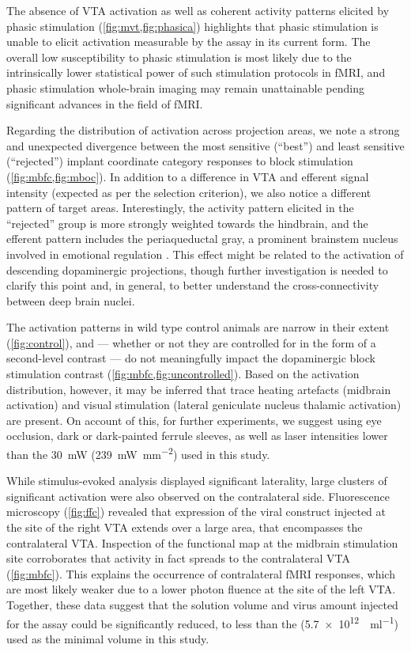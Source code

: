 The absence of VTA activation as well as coherent activity patterns elicited by phasic stimulation (\cref{fig:mvt,fig:phasica}) highlights that phasic stimulation is unable to elicit activation measurable by the assay in its current form.
The overall low susceptibility to phasic stimulation is most likely due to the intrinsically lower statistical power of such stimulation protocols in fMRI, and phasic stimulation whole-brain imaging may remain unattainable pending significant advances in the field of fMRI.

Regarding the distribution of activation across projection areas, we note a strong and unexpected divergence between the most sensitive (“best”) and least sensitive (“rejected”) implant coordinate category responses to block stimulation (\cref{fig:mbfc,fig:mboc}).
In addition to a difference in VTA and efferent signal intensity (expected as per the selection criterion), we also notice a different pattern of target areas.
Interestingly, the activity pattern elicited in the “rejected” group is more strongly weighted towards the hindbrain, and the efferent pattern includes the periaqueductal gray, a prominent brainstem nucleus involved in emotional regulation \cite{Benarroch2012}.
This effect might be related to the activation of descending dopaminergic projections, though further investigation is needed to clarify this point and, in general, to better understand the cross-connectivity between deep brain nuclei.

The activation patterns in wild type control animals are narrow in their extent (\cref{fig:control}), and --- whether or not they are controlled for in the form of a second-level contrast --- do not meaningfully impact the dopaminergic block stimulation contrast (\cref{fig:mbfc,fig:uncontrolled}).
Based on the activation distribution, however, it may be inferred that trace heating artefacts (midbrain activation) and visual stimulation (lateral geniculate nucleus thalamic activation) are present.
On account of this, for further experiments, we suggest using eye occlusion, dark or dark-painted ferrule sleeves, as well as laser intensities lower than the \SI{30}{\milli\watt} (\SI{239}{\milli\watt\per\milli\meter\squared}) used in this study.

While stimulus-evoked analysis displayed significant laterality, large clusters of significant activation were also observed on the contralateral side.
Fluorescence microscopy (\cref{fig:ffc}) revealed that expression of the viral construct injected at the site of the right VTA extends over a large area, that encompasses the contralateral VTA.
Inspection of the functional map at the midbrain stimulation site corroborates that activity in fact spreads to the contralateral VTA (\cref{fig:mbfc}).
This explains the occurrence of contralateral fMRI responses, which are most likely weaker due to a lower photon fluence at the site of the left VTA.
Together, these data suggest that the solution volume and virus amount injected for the assay could be significantly reduced, to less than the
(\SI{5.7e12}{\vg\per\milli\litre})
used as the minimal volume in this study.

